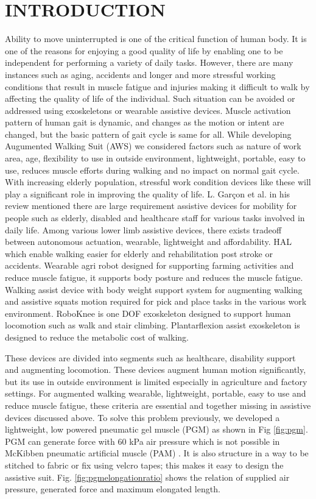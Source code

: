 \documentclass[letterpaper, 10 pt, conference]{ieeeconf}  %
\begin{document}
\section{INTRODUCTION}
Ability to move uninterrupted is one of the critical function of human body. It is one of the reasons for enjoying a good quality of life by enabling one to be independent for performing a variety of daily tasks. However, there are many instances such as aging, accidents and longer and more stressful working conditions that result in muscle fatigue and injuries making it difficult to walk by affecting the quality of life of the individual. Such situation can be avoided or addressed using exoskeletons or wearable assistive devices. Muscle activation pattern of human gait is dynamic, and changes as the motion or intent are changed, but the basic pattern of gait cycle is same for all. While developing Augumented Walking Suit (AWS) we considered factors such as nature of work area, age, flexibility to use in outside environment, lightweight, portable, easy to use, reduces muscle efforts during walking and no impact on normal gait cycle. With increasing elderly population, stressful work condition devices like these will play a significant role in improving the quality of life. L. Garçon et al. \cite{1} in his review mentioned there are large requirement assistive devices for mobility for people such as elderly, disabled and healthcare staff for various tasks involved in daily life. Among various lower limb assistive devices, there exists tradeoff between autonomous actuation, wearable, lightweight and affordability. HAL \cite{2} which enable walking easier for elderly and rehabilitation post stroke or accidents. Wearable agri robot \cite{3} designed for supporting farming activities and reduce muscle fatigue, it supports body posture and reduces the muscle fatigue. Walking assist device with body weight support system \cite{4} for augmenting walking and assistive squats motion required for pick and place tasks in the various work environment. RoboKnee \cite{5} is one DOF exoskeleton designed to support human locomotion such as walk and stair climbing. Plantarflexion assist exoskeleton \cite{6} is designed to reduce the metabolic cost of walking. 

These devices are divided into segments such as healthcare, disability support and augmenting locomotion. These devices augment human motion significantly, but its use in outside environment is limited especially in agriculture and factory settings. For augmented walking wearable, lightweight, portable, easy to use and reduce muscle fatigue, these criteria are essential and together missing in assistive devices discussed above. To solve this problem previously, we developed a lightweight, low powered pneumatic gel muscle (PGM) \cite{7} as shown in Fig \ref{fig:pgm}. PGM can generate force with 60 kPa air pressure which is not possible in McKibben pneumatic artificial muscle (PAM) \cite{8}. It is also structure in a way to be stitched to fabric or fix using velcro tapes; this makes it easy to design the assistive suit. Fig. \ref{fig:pgmelongationratio} shows the relation of supplied air pressure, generated force and maximum elongated length.
\end{document}
